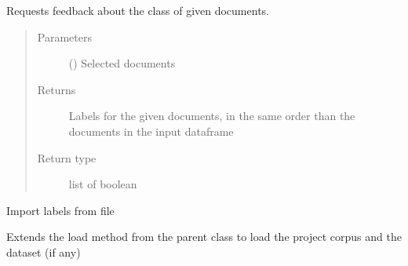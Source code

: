 \documentclass[letterpaper,10pt,english]{sphinxmanual}
\begin{document}
\begin{fulllineitems}
\begin{fulllineitems}
\end{fulllineitems}


\begin{fulllineitems}
\label{\detokenize{dc_task_manager:src.task_manager.TaskManager.get_labels_from_docs}}
\sphinxAtStartPar
Requests feedback about the class of given documents.
\begin{quote}\begin{description}
\item[{Parameters}] \leavevmode
\sphinxAtStartPar
{} () \textendash{} Selected documents

\item[{Returns}] \leavevmode
\sphinxAtStartPar
{} \textendash{} Labels for the given documents, in the same order than the
documents in the input dataframe

\item[{Return type}] \leavevmode
\sphinxAtStartPar
list of boolean

\end{description}\end{quote}

\end{fulllineitems}


\begin{fulllineitems}
\label{\detokenize{dc_task_manager:src.task_manager.TaskManager.import_labels}}
\sphinxAtStartPar
Import labels from file

\end{fulllineitems}


\begin{fulllineitems}
\label{\detokenize{dc_task_manager:src.task_manager.TaskManager.load}}
\sphinxAtStartPar
Extends the load method from the parent class to load the project
corpus and the dataset (if any)


\end{fulllineitems}
\end{fulllineitems}
\end{document}
